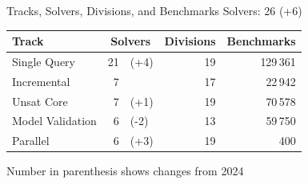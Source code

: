 \documentclass[table]{beamer}
\def\emph#1{\textcolor{MYblue}{#1}}
\begin{document}




\begin{frame}{Tracks, Solvers, Divisions, and Benchmarks}
  Solvers: 26 (+6) %
  \bigskip

  \begin{center}
    \begin{tabular}{lr@{}lr@{}rr}
      \toprule
      Track & \multicolumn{2}{c}{Solvers} & \multicolumn{2}{c}{Divisions}  & Benchmarks \\
      \midrule
      Single Query  &  21&(+4)  & &19  &  129\,361 \\
      Incremental &  7&   & & 17 & 22\,942 \\
      Unsat Core  &  7&(+1)   && 19  & 70\,578 \\
      Model Validation  &  6&(-2)    &  & 13 & 59\,750  \\
      Parallel & 6&(+3)      &  & 19 & 400 \\
      \bottomrule
    \end{tabular}
  \end{center}
  \bigskip

  Number in parenthesis shows changes from 2024
\end{frame}
\end{document}
